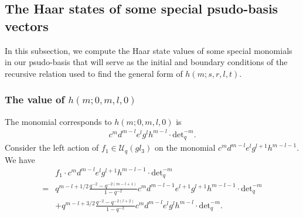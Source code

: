 \documentclass[table,a4paper,reqno]{amsart}
\numberwithin{equation}{section}
\theoremstyle{definition}
\begin{document}
\subsection{The Haar states of some special psudo-basis vectors}
In this subsection, we compute the Haar state values of some special monomials in our psudo-basis that will serve as the initial and boundary conditions of the recursive relation used to find the general form of $h(m;s,r,l,t)$.

\subsubsection{The value of $h(m;0,m,l,0)$}
The monomial corresponds to $h(m;0,m,l,0)$ is
\begin{align}
    c^md^{m-l}e^lg^lh^{m-l}\cdot\text{det}_q^{-m}.
\end{align}
Consider the left action of $f_1\in\mathcal{U}_q(gl_3)$ on the monomial $c^md^{m-l}e^lg^{l+1}h^{m-l-1}$. We have
\begin{equation}\label{eq:4.40}
    \begin{split}
        &f_1\cdot c^md^{m-l}e^lg^{l+1}h^{m-l-1}\cdot\text{det}_q^{-m}\\
        =&q^{m-l+1/2}\frac{q^{-2}-q^{-2(m-l+1)}}{1-q^{-2}}c^md^{m-l-1}e^{l+1}g^{l+1}h^{m-l-1}\cdot\text{det}_q^{-m}\\
        &+q^{m-l+3/2}\frac{q^{-2}-q^{-2(l+2)}}{1-q^{-2}}c^md^{m-l}e^lg^{l}h^{m-l}\cdot\text{det}_q^{-m}.
    \end{split}
\end{equation}
\end{document}
